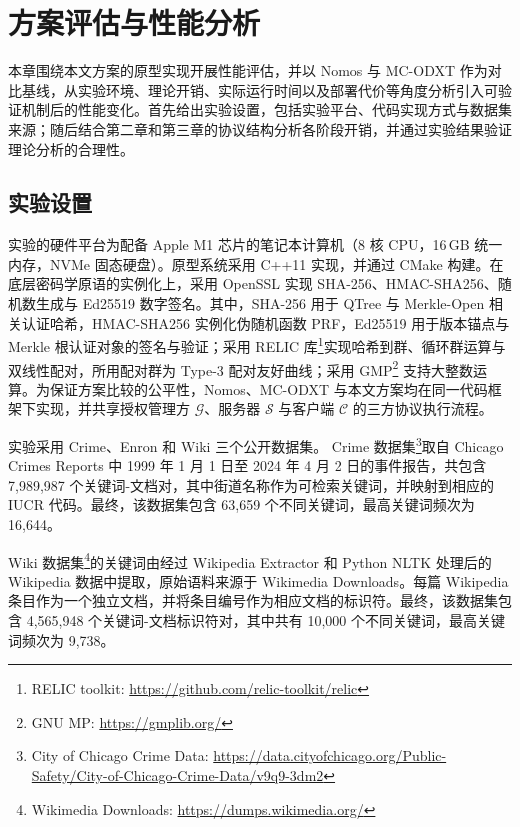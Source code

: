 
\chapter{方案评估与性能分析}\label{chap:experiments}

本章围绕本文方案的原型实现开展性能评估，并以 Nomos 与 MC-ODXT 作为对比基线，从实验环境、理论开销、实际运行时间以及部署代价等角度分析引入可验证机制后的性能变化。首先给出实验设置，包括实验平台、代码实现方式与数据集来源；随后结合第二章和第三章的协议结构分析各阶段开销，并通过实验结果验证理论分析的合理性。

\section{实验设置}\label{sec:experiment-setup}

实验的硬件平台为配备 Apple M1 芯片的笔记本计算机（8 核 CPU，16\,GB 统一内存，NVMe 固态硬盘）。原型系统采用 C++11 实现，并通过 CMake 构建。在底层密码学原语的实例化上，采用 OpenSSL 实现 SHA-256、HMAC-SHA256、随机数生成与 Ed25519 数字签名。其中，SHA-256 用于 QTree 与 Merkle-Open 相关认证哈希，HMAC-SHA256 实例化伪随机函数 PRF，Ed25519 用于版本锚点与 Merkle 根认证对象的签名与验证；采用 RELIC 库\footnote{RELIC toolkit: \url{https://github.com/relic-toolkit/relic}}实现哈希到群、循环群运算与双线性配对，所用配对群为 Type-3 配对友好曲线；采用 GMP\footnote{GNU MP: \url{https://gmplib.org/}} 支持大整数运算。为保证方案比较的公平性，Nomos、MC-ODXT 与本文方案均在同一代码框架下实现，并共享授权管理方 $\mathcal{G}$、服务器 $\mathcal{S}$ 与客户端 $\mathcal{C}$ 的三方协议执行流程。

实验采用 Crime、Enron 和 Wiki 三个公开数据集。
Crime 数据集\footnote{City of Chicago Crime Data: \url{https://data.cityofchicago.org/Public-Safety/City-of-Chicago-Crime-Data/v9q9-3dm2}}取自 Chicago Crimes Reports 中 1999 年 1 月 1 日至 2024 年 4 月 2 日的事件报告，共包含 7,989,987 个关键词-文档对，其中街道名称作为可检索关键词，并映射到相应的 IUCR 代码。最终，该数据集包含 63,659 个不同关键词，最高关键词频次为 16,644。

Wiki 数据集\footnote{Wikimedia Downloads: \url{https://dumps.wikimedia.org/}}的关键词由经过 Wikipedia Extractor 和 Python NLTK 处理后的 Wikipedia 数据中提取，原始语料来源于 Wikimedia Downloads。每篇 Wikipedia 条目作为一个独立文档，并将条目编号作为相应文档的标识符。最终，该数据集包含 4,565,948 个关键词-文档标识符对，其中共有 10,000 个不同关键词，最高关键词频次为 9,738。

